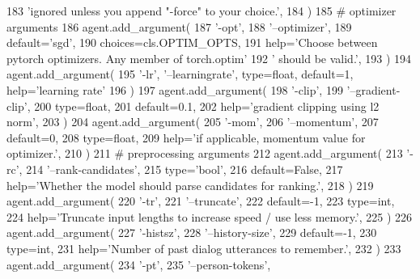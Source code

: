 \begin{DoxyCode}
183             \textcolor{stringliteral}{'ignored unless you append "-force" to your choice.'},
184         )
185         \textcolor{comment}{# optimizer arguments}
186         agent.add\_argument(
187             \textcolor{stringliteral}{'-opt'},
188             \textcolor{stringliteral}{'--optimizer'},
189             default=\textcolor{stringliteral}{'sgd'},
190             choices=cls.OPTIM\_OPTS,
191             help=\textcolor{stringliteral}{'Choose between pytorch optimizers. Any member of torch.optim'}
192             \textcolor{stringliteral}{' should be valid.'},
193         )
194         agent.add\_argument(
195             \textcolor{stringliteral}{'-lr'}, \textcolor{stringliteral}{'--learningrate'}, type=float, default=1, help=\textcolor{stringliteral}{'learning rate'}
196         )
197         agent.add\_argument(
198             \textcolor{stringliteral}{'-clip'},
199             \textcolor{stringliteral}{'--gradient-clip'},
200             type=float,
201             default=0.1,
202             help=\textcolor{stringliteral}{'gradient clipping using l2 norm'},
203         )
204         agent.add\_argument(
205             \textcolor{stringliteral}{'-mom'},
206             \textcolor{stringliteral}{'--momentum'},
207             default=0,
208             type=float,
209             help=\textcolor{stringliteral}{'if applicable, momentum value for optimizer.'},
210         )
211         \textcolor{comment}{# preprocessing arguments}
212         agent.add\_argument(
213             \textcolor{stringliteral}{'-rc'},
214             \textcolor{stringliteral}{'--rank-candidates'},
215             type=\textcolor{stringliteral}{'bool'},
216             default=\textcolor{keyword}{False},
217             help=\textcolor{stringliteral}{'Whether the model should parse candidates for ranking.'},
218         )
219         agent.add\_argument(
220             \textcolor{stringliteral}{'-tr'},
221             \textcolor{stringliteral}{'--truncate'},
222             default=-1,
223             type=int,
224             help=\textcolor{stringliteral}{'Truncate input lengths to increase speed / use less memory.'},
225         )
226         agent.add\_argument(
227             \textcolor{stringliteral}{'-histsz'},
228             \textcolor{stringliteral}{'--history-size'},
229             default=-1,
230             type=int,
231             help=\textcolor{stringliteral}{'Number of past dialog utterances to remember.'},
232         )
233         agent.add\_argument(
234             \textcolor{stringliteral}{'-pt'},
235             \textcolor{stringliteral}{'--person-tokens'},

\end{DoxyCode}
